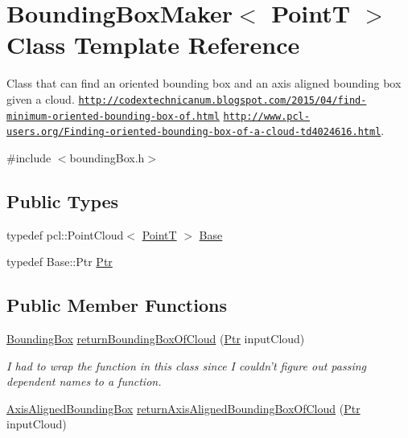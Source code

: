 \hypertarget{classBoundingBoxMaker}{\section{Bounding\-Box\-Maker$<$ Point\-T $>$ Class Template Reference}
\label{classBoundingBoxMaker}
}


Class that can find an oriented bounding box and an axis aligned bounding box given a cloud. \href{http://codextechnicanum.blogspot.com/2015/04/find-minimum-oriented-bounding-box-of.html}{\tt http\-://codextechnicanum.\-blogspot.\-com/2015/04/find-\/minimum-\/oriented-\/bounding-\/box-\/of.\-html} \href{http://www.pcl-users.org/Finding-oriented-bounding-box-of-a-cloud-td4024616.html}{\tt http\-://www.\-pcl-\/users.\-org/\-Finding-\/oriented-\/bounding-\/box-\/of-\/a-\/cloud-\/td4024616.\-html}.  




{\ttfamily \#include $<$bounding\-Box.\-h$>$}

\subsection*{Public Types}
\begin{DoxyCompactItemize}
\item 
typedef pcl\-::\-Point\-Cloud$<$ \hyperlink{features_8cpp_a42b086f8f138c5a6d16e8926efa9ba87}{Point\-T} $>$ \hyperlink{classBoundingBoxMaker_a1ab959296f462cd1be2211308f700e96}{Base}
\item 
typedef Base\-::\-Ptr \hyperlink{classBoundingBoxMaker_a5e4d960f36f827a84eae516597a00959}{Ptr}
\end{DoxyCompactItemize}
\subsection*{Public Member Functions}
\begin{DoxyCompactItemize}
\item 
\hyperlink{structBoundingBox}{Bounding\-Box} \hyperlink{classBoundingBoxMaker_a23e28cdb82b2eb624f687db39cb8ee22}{return\-Bounding\-Box\-Of\-Cloud} (\hyperlink{classBoundingBoxMaker_a5e4d960f36f827a84eae516597a00959}{Ptr} input\-Cloud)
\begin{DoxyCompactList}\small\item\em I had to wrap the function in this class since I couldn't figure out passing dependent names to a function. \end{DoxyCompactList}\item 
\hyperlink{structAxisAlignedBoundingBox}{Axis\-Aligned\-Bounding\-Box} \hyperlink{classBoundingBoxMaker_a504db8934bec432ae040720045c8fac2}{return\-Axis\-Aligned\-Bounding\-Box\-Of\-Cloud} (\hyperlink{classBoundingBoxMaker_a5e4d960f36f827a84eae516597a00959}{Ptr} input\-Cloud)
\end{DoxyCompactItemize}


